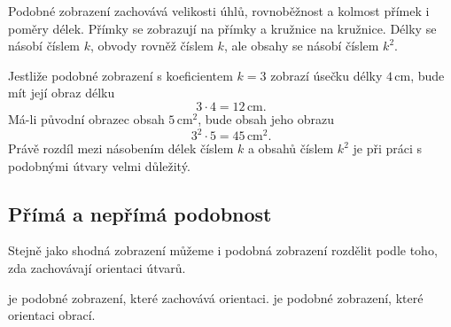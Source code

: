\documentclass[12pt,a4paper]{article}
\begin{document}
Podobné zobrazení zachovává velikosti úhlů, rovnoběžnost a kolmost přímek i poměry délek. Přímky se zobrazují na přímky a kružnice na kružnice. Délky se násobí číslem $k$, obvody rovněž číslem $k$, ale obsahy se násobí číslem $k^2$.

\begin{center}
\end{center}

\begin{examplebox}
    Jestliže podobné zobrazení s koeficientem $k=3$ zobrazí úsečku délky $4\,\mathrm{cm}$, bude mít její obraz délku
    \[
        3\cdot4=12\,\mathrm{cm}.
    \]
    Má-li původní obrazec obsah $5\,\mathrm{cm}^2$, bude obsah jeho obrazu
    \[
        3^2\cdot5=45\,\mathrm{cm}^2.
    \]
    Právě rozdíl mezi násobením délek číslem $k$ a obsahů číslem $k^2$ je při práci s podobnými útvary velmi důležitý.
\end{examplebox}



\subsection{Přímá a nepřímá podobnost}

Stejně jako shodná zobrazení můžeme i podobná zobrazení rozdělit podle toho, zda zachovávají orientaci útvarů.

\begin{definitionbox}
     je podobné zobrazení, které zachovává orientaci.  je podobné zobrazení, které orientaci obrací.
\end{definitionbox}
\end{document}
